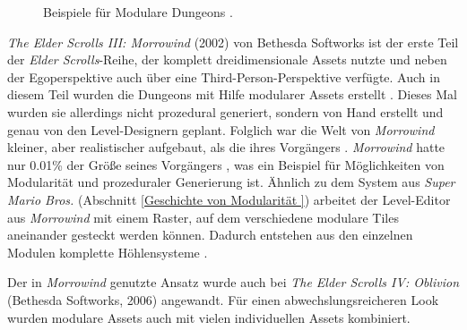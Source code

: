 \par
\begin{figure}[!h]
\centering
  \qquad
  \caption{Beispiele für Modulare Dungeons \parencite{Fallout4P}.}%
\end{figure}
\newpage
\textit{The Elder Scrolls III: Morrowind} (2002) von Bethesda Softworks ist der erste Teil der \textit{Elder Scrolls}-Reihe, der komplett dreidimensionale Assets nutzte und neben der Egoperspektive auch über eine Third-Person-Perspektive verfügte. Auch in diesem Teil wurden die Dungeons mit Hilfe modularer Assets erstellt \parencite{Fallout4}. Dieses Mal wurden sie allerdings nicht prozedural generiert, sondern von Hand erstellt und genau von den Level-Designern geplant. Folglich war die Welt von \textit{Morrowind} kleiner, aber realistischer aufgebaut, als die ihres Vorgängers \parencite{Morrowind}. \textit{Morrowind} hatte nur 0.01\% der Größe seines Vorgängers \parencite{Daggerfall}, was ein Beispiel für Möglichkeiten von Modularität und prozeduraler Generierung ist. Ähnlich zu dem System aus \textit{Super Mario Bros.} (Abschnitt \ref{Geschichte von Modularität }) arbeitet der Level-Editor aus \textit{Morrowind} mit einem Raster, auf dem verschiedene modulare Tiles aneinander gesteckt werden können. Dadurch entstehen aus den einzelnen Modulen komplette Höhlensysteme \parencite{Fallout4}.
\par
Der in \textit{Morrowind} genutzte Ansatz wurde auch bei \textit{The Elder Scrolls IV: Oblivion} (Bethesda Softworks, 2006) angewandt. Für einen abwechslungsreicheren Look wurden modulare Assets auch mit vielen individuellen Assets kombiniert. \parencite{Fallout4}
